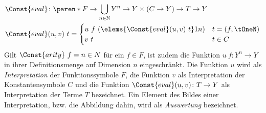 \begin{equation*}
    \begin{split}
	\Const{eval} &\colon \paren*{F \rightarrow \bigcup_{n \in \mathbb{N}} Y^n \rightarrow Y} \times (C \rightarrow Y) \rightarrow T \rightarrow Y\\
	\Const{eval} &(u, v)~t = \begin{cases}
		u~f~(\elems {\Const{eval}(u, v)~t} 1 n) & t = (f, \tOneN)\\
		v~t                                      & t \in C\\
		\end{cases}
    \end{split}
\end{equation*}
Gilt $\Const{arity}~f = n \in N$ für ein $f \in F$, ist zudem die Funktion $u~f \colon Y^n \rightarrow Y$ in ihrer Definitionsmenge auf Dimension $n$ eingeschränkt. 
Die Funktion $u$ wird als \emph{\Gls{Interpretation}} der Funktionssymbole $F$, die Funktion $v$ als Interpretation der Konstantensymbole $C$ und die Funktion $\Const{eval}(u, v) \colon T \rightarrow Y$ als Interpretation der Terme $T$ bezeichnet. 
Ein Element des Bildes einer Interpretation, bzw. die Abbildung dahin, wird als \emph{\Gls{Auswertung}} bezeichnet.
\\~\\

